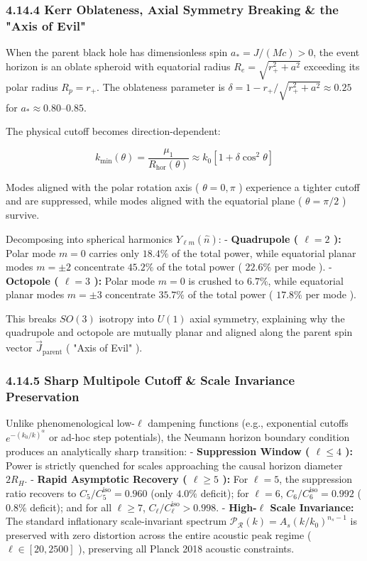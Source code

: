 \documentclass[11pt,a4paper]{article}
\theoremstyle{definition}\newtheorem{definition}{Definition}
\theoremstyle{remark}\newtheorem{remark}{Remark}
\begin{document}
\subsubsection{4.14.4 Kerr Oblateness, Axial Symmetry Breaking \& the "Axis of Evil"}

When the parent black hole has dimensionless spin $a_* = J/(M c) > 0$, the event horizon is an oblate spheroid with equatorial radius $R_e = \sqrt{r_+^2 + a^2}$ exceeding its polar radius $R_p = r_+$. The oblateness parameter is $\delta = 1 - r_+/\sqrt{r_+^2 + a^2} \approx 0.25$ for $a_* \approx 0.80\text{--}0.85$.

The physical cutoff becomes direction-dependent:


\begin{equation}
k_{\text{min}}(\theta) = \frac{\mu_1}{R_{\text{hor}}(\theta)} \approx k_0 \left[1 + \delta \cos^2\theta\right]
\end{equation}


Modes aligned with the polar rotation axis ( $\theta = 0, \pi$ ) experience a tighter cutoff and are suppressed, while modes aligned with the equatorial plane ( $\theta = \pi/2$ ) survive.

Decomposing into spherical harmonics $Y_{\ell m}(\hat{n})$:
- \textbf{Quadrupole ( $\ell = 2$ ):} Polar mode $m = 0$ carries only $18.4\%$ of the total power, while equatorial planar modes $m = \pm 2$ concentrate $45.2\%$ of the total power ( $22.6\%$ per mode ).
- \textbf{Octopole ( $\ell = 3$ ):} Polar mode $m = 0$ is crushed to $6.7\%$, while equatorial planar modes $m = \pm 3$ concentrate $35.7\%$ of the total power ( $17.8\%$ per mode ).

This breaks $SO(3)$ isotropy into $U(1)$ axial symmetry, explaining why the quadrupole and octopole are mutually planar and aligned along the parent spin vector $\vec{J}_{\text{parent}}$ ( "Axis of Evil" ).
\subsubsection{4.14.5 Sharp Multipole Cutoff \& Scale Invariance Preservation}

Unlike phenomenological low-$\ell$ dampening functions (e.g., exponential cutoffs $e^{-(k_0/k)^\alpha}$ or ad-hoc step potentials), the Neumann horizon boundary condition produces an analytically sharp transition:
- \textbf{Suppression Window ( $\ell \le 4$ ):} Power is strictly quenched for scales approaching the causal horizon diameter $2 R_H$.
- \textbf{Rapid Asymptotic Recovery ( $\ell \ge 5$ ):} For $\ell = 5$, the suppression ratio recovers to $C_5 / C_5^{\text{iso}} = 0.960$ (only $4.0\%$ deficit); for $\ell = 6$, $C_6 / C_6^{\text{iso}} = 0.992$ ( $0.8\%$ deficit); and for all $\ell \ge 7$, $C_\ell / C_\ell^{\text{iso}} > 0.998$.
- \textbf{High-$\ell$ Scale Invariance:} The standard inflationary scale-invariant spectrum $\mathcal{P}_\mathcal{R}(k) = A_s (k/k_0)^{n_s - 1}$ is preserved with zero distortion across the entire acoustic peak regime ( $\ell \in [20, 2500]$ ), preserving all Planck 2018 acoustic constraints.
\end{document}
